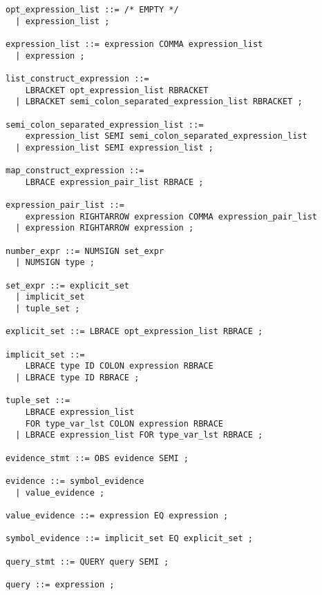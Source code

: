 \documentclass[12pt]{article}
\begin{document}
\begin{verbatim}
opt_expression_list ::= /* EMPTY */
  | expression_list ;

expression_list ::= expression COMMA expression_list
  | expression ;

list_construct_expression ::= 
    LBRACKET opt_expression_list RBRACKET
  | LBRACKET semi_colon_separated_expression_list RBRACKET ;

semi_colon_separated_expression_list ::=
    expression_list SEMI semi_colon_separated_expression_list
  | expression_list SEMI expression_list ;

map_construct_expression ::= 
    LBRACE expression_pair_list RBRACE ;

expression_pair_list ::=
    expression RIGHTARROW expression COMMA expression_pair_list
  | expression RIGHTARROW expression ;
  
number_expr ::= NUMSIGN set_expr
  | NUMSIGN type ;

set_expr ::= explicit_set
  | implicit_set
  | tuple_set ;

explicit_set ::= LBRACE opt_expression_list RBRACE ;

implicit_set ::= 
    LBRACE type ID COLON expression RBRACE
  | LBRACE type ID RBRACE ;

tuple_set ::= 
    LBRACE expression_list 
    FOR type_var_lst COLON expression RBRACE
  | LBRACE expression_list FOR type_var_lst RBRACE ;

evidence_stmt ::= OBS evidence SEMI ;

evidence ::= symbol_evidence
  | value_evidence ;

value_evidence ::= expression EQ expression ;

symbol_evidence ::= implicit_set EQ explicit_set ;

query_stmt ::= QUERY query SEMI ;

query ::= expression ;
\end{verbatim}
\end{document}
